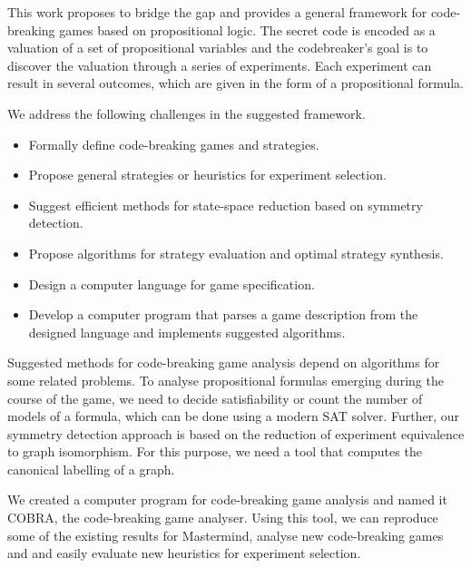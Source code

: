 This work proposes to bridge the gap and provides
  a general framework for code-breaking games
  based on propositional logic.
The secret code is encoded as a valuation of
  a set of propositional variables
  and the codebreaker's goal is to discover the valuation
  through a series of experiments.
Each experiment can result in several outcomes,
  which are given in the form of a propositional formula.

We address the following challenges in the suggested framework.
\begin{itemize}
\item Formally define code-breaking games and strategies.
\item Propose general strategies or heuristics for experiment selection.
\item Suggest efficient methods for state-space reduction based on symmetry detection.
\item Propose algorithms for strategy evaluation and optimal strategy synthesis.
\item Design a computer language for game specification.
\item Develop a computer program that parses a game description from the
  designed language and implements suggested algorithms.
\end{itemize}

Suggested methods for code-breaking game analysis depend
  on algorithms for some related problems.
To analyse propositional formulas emerging during the course of the game,
  we need to decide satisfiability or count the number of models of
  a formula, which can be done using a modern SAT solver.
Further, our symmetry detection approach is based on the reduction
  of experiment equivalence to graph isomorphism.
For this purpose, we need a tool that computes the canonical labelling of a graph.


We created a computer program for code-breaking game analysis and named it COBRA,
  the code-breaking game analyser.
Using this tool, we can reproduce some of the existing results
  for Mastermind, analyse new code-breaking games and and easily evaluate new heuristics
  for experiment selection.

